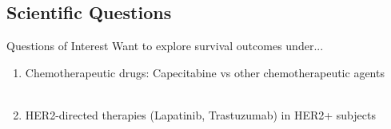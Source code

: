 \subsection{Scientific Questions}
\begin{frame}{Questions of Interest}
Want to explore survival outcomes under...
\begin{enumerate}
 \item Chemotherapeutic drugs: Capecitabine vs other chemotherapeutic agents\\~\\
 \item HER2-directed therapies (Lapatinib, Trastuzumab) in HER2+ subjects
 \end{enumerate}
 
  
 
 


\end{frame}


